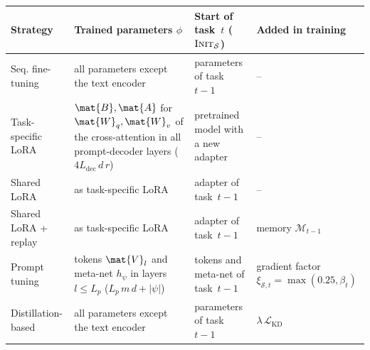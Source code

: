 \small\renewcommand{\arraystretch}{1.2}\setlength{\tabcolsep}{4pt}
\begin{tabularx}{\linewidth}{@{}>{\raggedright\arraybackslash}p{3.0cm}>{\raggedright\arraybackslash}X>{\raggedright\arraybackslash}p{3.2cm}>{\raggedright\arraybackslash}p{3.3cm}@{}}
\toprule
Strategy & Trained parameters $\phi$ & Start of task~$t$ ($\textsc{Init}_{\mathcal{S}}$) & Added in training \\
\midrule
Seq. fine-tuning & all parameters except the text encoder & parameters of task~$t-1$ & -- \\
Task-specific LoRA & $\mat{B}, \mat{A}$ for $\mat{W}_q, \mat{W}_v$ of the cross-attention in all prompt-decoder layers ($4 L_{\mathrm{dec}}\, d\, r$) & pretrained model with a new adapter & -- \\
Shared LoRA & as task-specific LoRA & adapter of task~$t-1$ & -- \\
Shared LoRA + replay & as task-specific LoRA & adapter of task~$t-1$ & memory $\mathcal{M}_{t-1}$ \\
Prompt tuning & tokens $\mat{V}_l$ and meta-net $h_\psi$ in layers $l \le L_p$ ($L_p\, m\, d + |\psi|$) & tokens and meta-net of task~$t-1$ & gradient factor $\xi_{\mathcal{S},t} = \max(0.25, \beta_t)$ \\
Distillation-based & all parameters except the text encoder & parameters of task~$t-1$ & $\lambda\,\mathcal{L}_{\mathrm{KD}}$ \\
\bottomrule
\end{tabularx}
